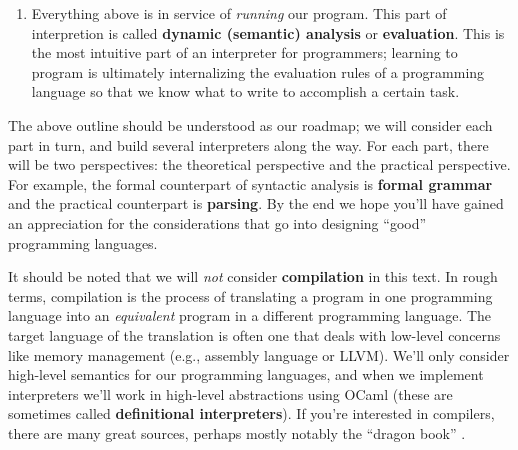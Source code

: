 \begin{enumerate}
  Types help us describe what kind of things we're working with \textit{before we run our program}.
  They help us determine \textit{before we run our program} if we're using data correctly.
  In analogy with natural language, this is akin to the uneasy feeling you get when you hear or see a sentence like \enquote{the happiness is cold}; the word \enquote{happiness} isn't the right kind of word for its place in the sentence, despite the fact that the sentence is grammatically correct.
  Not all languages have type checkers, but we maintain that \enquote{good} languages have type checkers.
\item
  Everything above is in service of \textit{running} our program.
  This part of interpretion is called \textbf{dynamic (semantic) analysis} or \textbf{evaluation}.
  This is the most intuitive part of an interpreter for programmers; learning to program is ultimately internalizing the evaluation rules of a programming language so that we know what to write to accomplish a certain task.
\end{enumerate}
The above outline should be understood as our roadmap; we will consider each part in turn, and build several interpreters along the way.
For each part, there will be two perspectives: the theoretical perspective and the practical perspective.
For example, the formal counterpart of syntactic analysis is \textbf{formal grammar} and the practical counterpart is \textbf{parsing}.
By the end we hope you'll have gained an appreciation for the considerations that go into designing \enquote{good} programming languages.

\begin{remark}
It should be noted that we will \textit{not} consider \textbf{compilation} in this text.
In rough terms, compilation is the process of translating a program in one programming language into an \textit{equivalent} program in a different programming language.
The target language of the translation is often one that deals with low-level concerns like memory management (e.g., assembly language or LLVM).
We'll only consider high-level semantics for our programming languages, and when we implement interpreters we'll work in high-level abstractions using OCaml (these are sometimes called \textbf{definitional interpreters}).
If you're interested in compilers, there are many great sources, perhaps mostly notably the \enquote{dragon book} \cite{alfred-et-al-2007}.
\end{remark}
